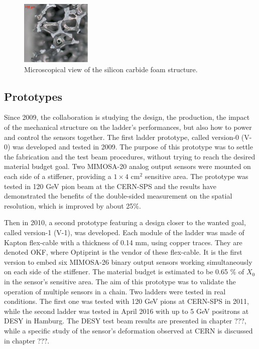    \begin{figure}[!h]
      \centering
      \includegraphics[width=0.3\textwidth]{Pictures/vxd/foam2.png}
      \caption{Microscopical view of the silicon carbide foam structure.}
      \label{fig:SiC}
    \end{figure}

    \subsection{Prototypes}

    Since 2009, the collaboration is studying the design, the production, the impact of the mechanical structure on the ladder's performances, but also how to power and control the sensors together.
    The first ladder prototype, called version-0 (V-0) was developed and tested in 2009.
    The purpose of this prototype was to settle the fabrication and the test beam procedures, without trying to reach the desired material budget goal.
    Two MIMOSA-20 analog output sensors were mounted on each side of a stiffener, providing a $1 \times 4 \text{ cm}^2$ sensitive area.
    The prototype was tested in 120 GeV pion beam at the CERN-SPS and the results have demonstrated the benefits of the double-sided measurement on the spatial resolution, which is improved by about 25\%\cite{Nomerotski}.

    Then in 2010, a second prototype featuring a design closer to the wanted goal, called version-1 (V-1), was developed.
    Each module of the ladder was made of Kapton flex-cable with a thickness of 0.14 mm, using copper traces.
    They are denoted \gls{OKF}, where Optiprint is the vendor of these flex-cable.
    It is the first version to embed six MIMOSA-26 binary output sensors working simultaneously on each side of the stiffener.
    The material budget is estimated to be 0.65 \% of $X_0$ in the sensor's sensitive area. 
    The aim of this prototype was to validate the operation of multiple sensors in a chain.
    Two ladders were tested in real conditions.
    The first one was tested with 120 GeV pions at CERN-SPS in 2011, while the second ladder was tested in April 2016 with up to 5 GeV positrons at DESY in Hamburg. 
    The DESY test beam results are presented in chapter ???, while a specific study of the sensor's deformation observed at CERN is discussed in chapter ???.


